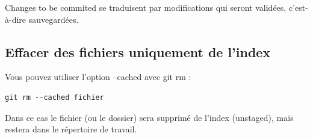 \documentclass{article}
\begin{document}
{\color{blue}Changes to be commited} se traduisent par modifications qui seront validées, c'est-à-dire sauvegardées.

\subsection{Effacer des fichiers uniquement de l'index}
Vous pouvez utiliser l'option {\color{blue}--cached} avec {\color{blue}git rm} :


\begin{verbatim}
git rm --cached fichier
\end{verbatim}
Dans ce cas le fichier (ou le dossier) sera supprimé de l'index ({\color{blue}unstaged}), mais restera dans le répertoire de travail.
\end{document}
